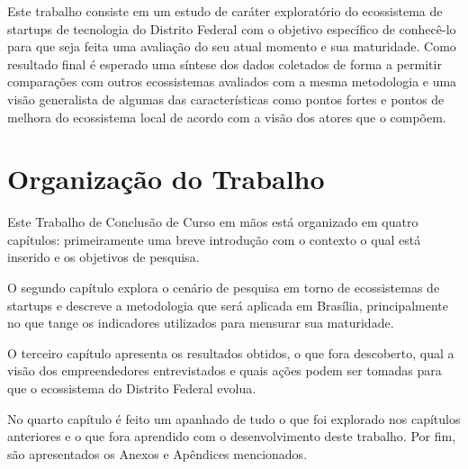 Este trabalho consiste em um estudo de caráter exploratório do ecossistema de startups de tecnologia do Distrito Federal com o objetivo específico de conhecê-lo para que seja feita uma avaliação do seu atual momento e sua maturidade. Como resultado final é esperado uma síntese dos dados coletados de forma a permitir comparações com outros ecossistemas avaliados com a mesma metodologia e uma visão generalista de algumas das características como pontos fortes e pontos de melhora do ecossistema local de acordo com a visão dos atores que o compõem. 

\section{Organização do Trabalho}
\label{section:organizacao_do_trabalho}

Este Trabalho de Conclusão de Curso em mãos está organizado em quatro capítulos: primeiramente uma breve introdução com o contexto o qual está inserido e os objetivos de pesquisa.

O segundo capítulo explora o cenário de pesquisa em torno de ecossistemas de startups e descreve a metodologia que será aplicada em Brasília, principalmente no que tange os indicadores utilizados para mensurar sua maturidade.

O terceiro capítulo apresenta os resultados obtidos, o que fora descoberto, qual a visão dos empreendedores entrevistados e quais ações podem ser tomadas para que o ecossistema do Distrito Federal evolua.

No quarto capítulo é feito um apanhado de tudo o que foi explorado nos capítulos anteriores e o que fora aprendido com o desenvolvimento deste trabalho. Por fim, são apresentados os Anexos e Apêndices mencionados.
